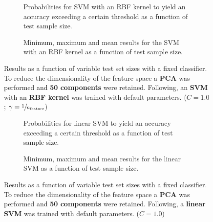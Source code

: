 \begin{figure}
    \captionsetup[subfigure]{justification=justified,singlelinecheck=false}
    \begin{subfigure}[t]{0.61\textwidth}
        
        \caption{Probabilities for SVM with an RBF kernel to yield an accuracy exceeding a certain threshold as a function of test sample size.}
    \end{subfigure}
    \hspace{3.0mm}
    \begin{subfigure}[t]{0.34\textwidth}
        
        \caption{Minimum, maximum and mean results for the SVM with an RBF kernel as a function of test sample size.}
    \end{subfigure}
    \caption[Effects of varying test sample size. SVM (kernel = RBF); Preprocessing: PCA ($n_\text{components} = \num{50}$)]{Results as a function of variable test set sizes with a fixed classifier. To reduce the dimensionality of the feature space a \textbf{PCA} was performed and \textbf{50 components} were retained. Following, an \textbf{{SVM}} with an \textbf{{RBF kernel}} was trained with default parameters. ($C=\num{1.0}$; $\gamma=\sfrac{1}{n_\text{feature}}$)}
    \label{fig:PCA_50_components_no_selection_SVC}
\end{figure}

\begin{figure}
    \captionsetup[subfigure]{justification=justified,singlelinecheck=false}
    \begin{subfigure}[t]{0.61\textwidth}
        
        \caption{Probabilities for linear SVM to yield an accuracy exceeding a certain threshold as a function of test sample size.}
    \end{subfigure}
    \hspace{3.0mm}
    \begin{subfigure}[t]{0.34\textwidth}
        
        \caption{Minimum, maximum and mean results for the linear SVM as a function of test sample size.}
    \end{subfigure}
    \caption[Effects of varying test sample size. Linear SVM; Preprocessing: PCA ($n_\text{components} = \num{50}$)]{Results as a function of variable test set sizes with a fixed classifier. To reduce the dimensionality of the feature space a \textbf{PCA} was performed and \textbf{50 components} were retained. Following, a \textbf{{linear SVM}} was trained with default parameters. ($C=\num{1.0}$)}
    \label{fig:PCA_50_components_no_selection_LinearSVC}
\end{figure}


